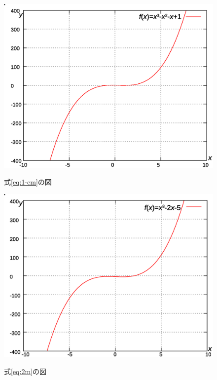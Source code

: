 \documentclass[12pt]{jarticle}
\renewcommand  \[  {\begin{eqnarray}}
\renewcommand  \]  {\end{eqnarray}}
\begin{document}
\begin{figure}[p]
\begin{minipage}{7.95cm}
\includegraphics[scale=0.35]{graph3.eps}
\caption{式\ref{eq:1-cm}の図}
\label{fig:1-cm}
\includegraphics[scale=0.35]{graph4.eps}
\caption{式\ref{eq:2m}の図}
\label{fig:2-m}
\end{minipage}
\end{figure}
\end{document}
